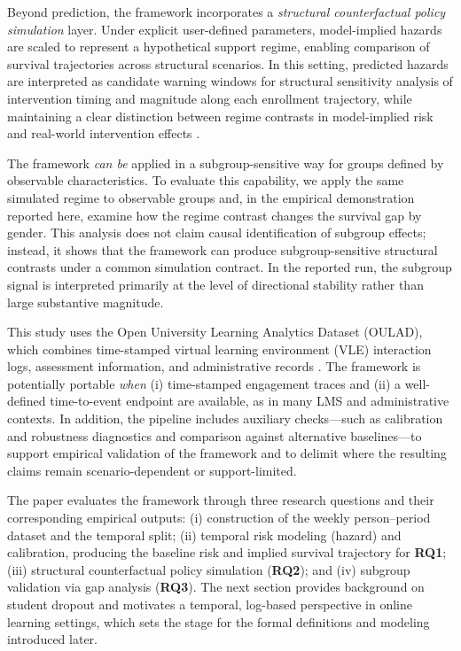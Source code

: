 Beyond prediction, the framework incorporates a \emph{structural counterfactual policy simulation} layer. Under explicit user-defined parameters, model-implied hazards are scaled to represent a hypothetical support regime, enabling comparison of survival trajectories across structural scenarios. In this setting, predicted hazards are interpreted as candidate warning windows for structural sensitivity analysis of intervention timing and magnitude along each enrollment trajectory, while maintaining a clear distinction between regime contrasts in model-implied risk and real-world intervention effects \cite{Igelstrom2022CausalInferenceObs,DoutreligneVaroquaux2025PredictiveDecisionCausal}.

The framework \emph{can be} applied in a subgroup-sensitive way for groups defined by observable characteristics. To evaluate this capability, we apply the same simulated regime to observable groups and, in the empirical demonstration reported here, examine how the regime contrast changes the survival gap by gender. This analysis does not claim causal identification of subgroup effects; instead, it shows that the framework can produce subgroup-sensitive structural contrasts under a common simulation contract. In the reported run, the subgroup signal is interpreted primarily at the level of directional stability rather than large substantive magnitude.

This study uses the Open University Learning Analytics Dataset (OULAD), which combines time-stamped virtual learning environment (VLE) interaction logs, assessment information, and administrative records \cite{Kuzilek2017OULAD}. The framework is potentially portable \emph{when} (i) time-stamped engagement traces and (ii) a well-defined time-to-event endpoint are available, as in many LMS and administrative contexts. In addition, the pipeline includes auxiliary checks---such as calibration and robustness diagnostics and comparison against alternative baselines---to support empirical validation of the framework and to delimit where the resulting claims remain scenario-dependent or support-limited.

The paper evaluates the framework through three research questions and their corresponding empirical outputs: (i) construction of the weekly person--period dataset and the temporal split; (ii) temporal risk modeling (hazard) and calibration, producing the baseline risk and implied survival trajectory for \textbf{RQ1}; (iii) structural counterfactual policy simulation (\textbf{RQ2}); and (iv) subgroup validation via gap analysis (\textbf{RQ3}). The next section provides background on student dropout and motivates a temporal, log-based perspective in online learning settings, which sets the stage for the formal definitions and modeling introduced later.